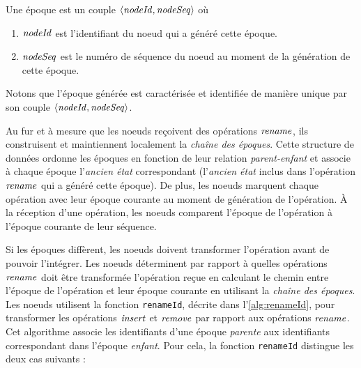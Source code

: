 \begin{definition}[Époque]
  Une époque est un couple $\langle \mathit{nodeId}, \mathit{nodeSeq} \rangle$ où
  \begin{enumerate}
    \item $\mathit{nodeId}$ est l'identifiant du noeud qui a généré cette époque.
    \item $\mathit{nodeSeq}$ est le numéro de séquence du noeud au moment de la génération de cette époque.
  \end{enumerate}
\end{definition}

Notons que l'époque générée est caractérisée et identifiée de manière unique par son couple $\langle \mathit{nodeId}, \mathit{nodeSeq} \rangle$.

Au fur et à mesure que les noeuds reçoivent des opérations $\mathit{rename}$, ils construisent et maintiennent localement la \emph{chaîne des époques}.
Cette structure de données ordonne les époques en fonction de leur relation \emph{parent-enfant} et associe à chaque époque l'\emph{ancien état} correspondant (\ie l'\emph{ancien état} inclus dans l'opération $\mathit{rename}$ qui a généré cette époque).
De plus, les noeuds marquent chaque opération avec leur époque courante au moment de génération de l'opération.
À la réception d'une opération, les noeuds comparent l'époque de l'opération à l'époque courante de leur séquence.

Si les époques diffèrent, les noeuds doivent transformer l'opération avant de pouvoir l'intégrer.
Les noeuds déterminent par rapport à quelles opérations $\mathit{rename}$ doit être transformée l'opération reçue en calculant le chemin entre l'époque de l'opération et leur époque courante en utilisant la \emph{chaîne des époques}.\\

Les noeuds utilisent la fonction \texttt{renameId}, décrite dans l'\autoref{alg:renameId}\footnotemark, pour transformer les opérations $\mathit{insert}$ et $\mathit{remove}$ par rapport aux opérations $\mathit{rename}$.
Cet algorithme associe les identifiants d'une époque \emph{parente} aux identifiants correspondant dans l'époque \emph{enfant}.
Pour cela, la fonction \texttt{renameId} distingue les deux cas suivants :

